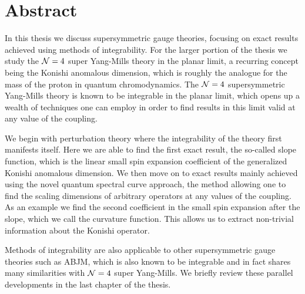 
\section*{Abstract}

\vspace{30pt}




In this thesis we discuss supersymmetric gauge theories, focusing on exact results achieved using methods of integrability. 
For the larger portion of the thesis we study the $\mathcal{N}=4$ super Yang-Mills theory in the planar limit, a recurring concept being the Konishi anomalous dimension, which is roughly the analogue for the mass of the proton in quantum chromodynamics.
The $\mathcal{N}=4$ supersymmetric Yang-Mills theory is known to be integrable in the planar limit, which opens up a wealth of techniques one can employ in order to find results in this limit valid at any value of the coupling. 

We begin with perturbation theory where the integrability of the theory first manifests itself.
Here we are able to find the first exact result, the so-called slope function, which is the linear small spin expansion coefficient of the generalized Konishi anomalous dimension.
We then move on to exact results mainly achieved using the novel quantum spectral curve approach, the method allowing one to find the scaling dimensions of arbitrary operators at any values of the coupling.
As an example we find the second coefficient in the small spin expansion after the slope, which we call the curvature function.
This allows us to extract non-trivial information about the Konishi operator.

Methods of integrability are also applicable to other supersymmetric gauge theories such as ABJM, which is also known to be integrable and in fact shares many similarities with $\mathcal{N}=4$ super Yang-Mills. We briefly review these parallel developments in the last chapter of the thesis.
